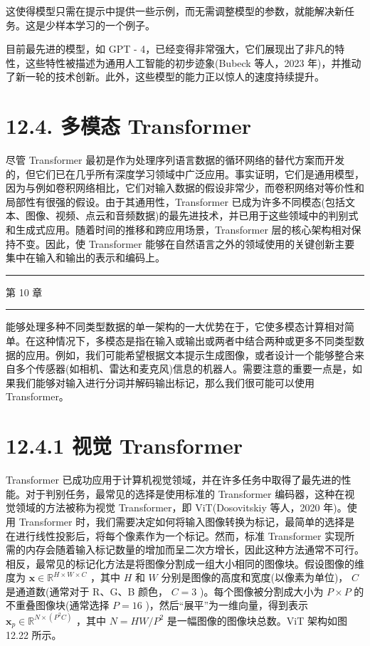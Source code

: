 \documentclass[10pt]{report}
\newcommand{\HRule}{\begin{center}\rule{0.9\linewidth}{0.2mm}\end{center}}
\begin{document}
这使得模型只需在提示中提供一些示例，而无需调整模型的参数，就能解决新任务。这是少样本学习的一个例子。

目前最先进的模型，如 GPT - 4，已经变得非常强大，它们展现出了非凡的特性，这些特性被描述为通用人工智能的初步迹象(Bubeck 等人，2023 年)，并推动了新一轮的技术创新。此外，这些模型的能力正以惊人的速度持续提升。

\section*{12.4. 多模态 Transformer}

尽管 Transformer 最初是作为处理序列语言数据的循环网络的替代方案而开发的，但它们已在几乎所有深度学习领域中广泛应用。事实证明，它们是通用模型，因为与例如卷积网络相比，它们对输入数据的假设非常少，而卷积网络对等价性和局部性有很强的假设。由于其通用性，Transformer 已成为许多不同模态(包括文本、图像、视频、点云和音频数据)的最先进技术，并已用于这些领域中的判别式和生成式应用。随着时间的推移和跨应用场景，Transformer 层的核心架构相对保持不变。因此，使 Transformer 能够在自然语言之外的领域使用的关键创新主要集中在输入和输出的表示和编码上。

\HRule

第 10 章

\HRule

能够处理多种不同类型数据的单一架构的一大优势在于，它使多模态计算相对简单。在这种情况下，多模态是指在输入或输出或两者中结合两种或更多不同类型数据的应用。例如，我们可能希望根据文本提示生成图像，或者设计一个能够整合来自多个传感器(如相机、雷达和麦克风)信息的机器人。需要注意的重要一点是，如果我们能够对输入进行分词并解码输出标记，那么我们很可能可以使用 Transformer。

\section*{12.4.1 视觉 Transformer}

Transformer 已成功应用于计算机视觉领域，并在许多任务中取得了最先进的性能。对于判别任务，最常见的选择是使用标准的 Transformer 编码器，这种在视觉领域的方法被称为视觉 Transformer，即 ViT(Dosovitskiy 等人，2020 年)。使用 Transformer 时，我们需要决定如何将输入图像转换为标记，最简单的选择是在进行线性投影后，将每个像素作为一个标记。然而，标准 Transformer 实现所需的内存会随着输入标记数量的增加而呈二次方增长，因此这种方法通常不可行。相反，最常见的标记化方法是将图像分割成一组大小相同的图像块。假设图像的维度为 \(\mathbf{x} \in  {\mathbb{R}}^{H \times  W \times  C}\) ，其中 \(H\) 和 \(W\) 分别是图像的高度和宽度(以像素为单位)， \(C\) 是通道数(通常对于 R、G、B 颜色， \(C = 3\) )。每个图像被分割成大小为 \(P \times  P\) 的不重叠图像块(通常选择 \(P = {16}\) )，然后“展平”为一维向量，得到表示 \({\mathbf{x}}_{p} \in  {\mathbb{R}}^{N \times  \left( {{P}^{2}C}\right) }\) ，其中 \(N = {HW}/{P}^{2}\) 是一幅图像的图像块总数。ViT 架构如图 12.22 所示。
\end{document}
